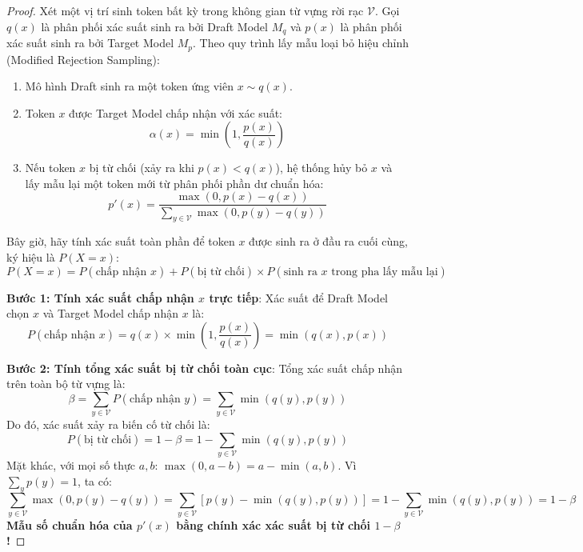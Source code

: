 \begin{proof}
Xét một vị trí sinh token bất kỳ trong không gian từ vựng rời rạc $\mathcal{V}$.
Gọi $q(x)$ là phân phối xác suất sinh ra bởi Draft Model $M_q$ và $p(x)$ là phân phối xác suất sinh ra bởi Target Model $M_p$.
Theo quy trình lấy mẫu loại bỏ hiệu chỉnh (Modified Rejection Sampling):
\begin{enumerate}
  \item Mô hình Draft sinh ra một token ứng viên $x \sim q(x)$.
  \item Token $x$ được Target Model chấp nhận với xác suất:
  \begin{equation}
  \alpha(x) = \min\left(1, \frac{p(x)}{q(x)}\right)
  \end{equation}
  \item Nếu token $x$ bị từ chối (xảy ra khi $p(x) < q(x)$), hệ thống hủy bỏ $x$ và lấy mẫu lại một token mới từ phân phối phần dư chuẩn hóa:
  \begin{equation}
  p'(x) = \frac{\max(0, p(x) - q(x))}{\sum_{y \in \mathcal{V}} \max(0, p(y) - q(y))}
  \end{equation}
\end{enumerate}

Bây giờ, hãy tính xác suất toàn phần để token $x$ được sinh ra ở đầu ra cuối cùng, ký hiệu là $P(X = x)$:
\begin{equation}
P(X = x) = P(\text{chấp nhận } x) + P(\text{bị từ chối}) \times P(\text{sinh ra } x \text{ trong pha lấy mẫu lại})
\end{equation}

\textbf{Bước 1: Tính xác suất chấp nhận $x$ trực tiếp}:
Xác suất để Draft Model chọn $x$ và Target Model chấp nhận $x$ là:
\begin{equation}
P(\text{chấp nhận } x) = q(x) \times \min\left(1, \frac{p(x)}{q(x)}\right) = \min(q(x), p(x))
\end{equation}

\textbf{Bước 2: Tính tổng xác suất bị từ chối toàn cục}:
Tổng xác suất chấp nhận trên toàn bộ từ vựng là:
\begin{equation}
\beta = \sum_{y \in \mathcal{V}} P(\text{chấp nhận } y) = \sum_{y \in \mathcal{V}} \min(q(y), p(y))
\end{equation}
Do đó, xác suất xảy ra biến cố từ chối là:
\begin{equation}
P(\text{bị từ chối}) = 1 - \beta = 1 - \sum_{y \in \mathcal{V}} \min(q(y), p(y))
\end{equation}
Mặt khác, với mọi số thực $a, b$: $\max(0, a - b) = a - \min(a, b)$. Vì $\sum_y p(y) = 1$, ta có:
\begin{equation}
\sum_{y \in \mathcal{V}} \max(0, p(y) - q(y)) = \sum_{y \in \mathcal{V}} \left[ p(y) - \min(q(y), p(y)) \right] = 1 - \sum_{y \in \mathcal{V}} \min(q(y), p(y)) = 1 - \beta
\end{equation}
\textbf{Mẫu số chuẩn hóa của $p'(x)$ bằng chính xác xác suất bị từ chối $1 - \beta$!}


\end{proof}
